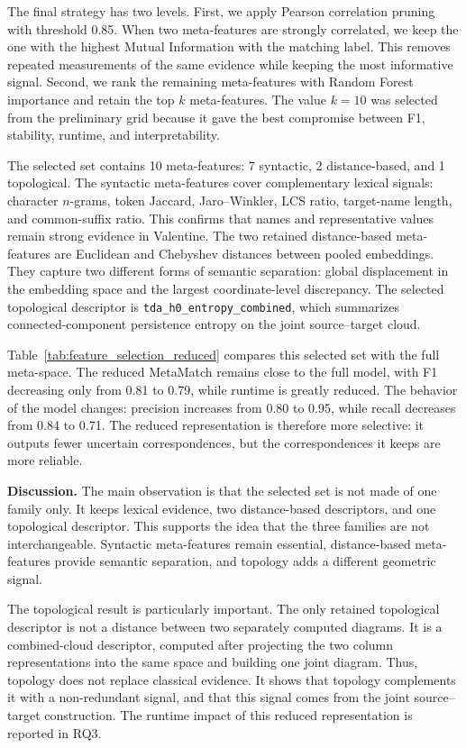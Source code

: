 \documentclass[sigconf, nonacm]{acmart}
\begin{document}
The final strategy has two levels. First, we apply Pearson correlation pruning with threshold 0.85. When two meta-features are strongly correlated, we keep the one with the highest Mutual Information with the matching label. This removes repeated measurements of the same evidence while keeping the most informative signal. Second, we rank the remaining meta-features with Random Forest importance and retain the top $k$ meta-features. The value $k=10$ was selected from the preliminary grid because it gave the best compromise between F1, stability, runtime, and interpretability.

The selected set contains 10 meta-features: 7 syntactic, 2 distance-based, and 1 topological. The syntactic meta-features cover complementary lexical signals: character $n$-grams, token Jaccard, Jaro--Winkler, LCS ratio, target-name length, and common-suffix ratio. This confirms that names and representative values remain strong evidence in Valentine. The two retained distance-based meta-features are Euclidean and Chebyshev distances between pooled embeddings. They capture two different forms of semantic separation: global displacement in the embedding space and the largest coordinate-level discrepancy. The selected topological descriptor is \texttt{tda\_h0\_entropy\_combined}, which summarizes connected-component persistence entropy on the joint source--target cloud.

Table~\ref{tab:feature_selection_reduced} compares this selected set with the full meta-space. The reduced MetaMatch remains close to the full model, with F1 decreasing only from 0.81 to 0.79, while runtime is greatly reduced. The behavior of the model changes: precision increases from 0.80 to 0.95, while recall decreases from 0.84 to 0.71. The reduced representation is therefore more selective: it outputs fewer uncertain correspondences, but the correspondences it keeps are more reliable.


\noindent\textbf{Discussion.}
The main observation is that the selected set is not made of one family only. It keeps lexical evidence, two distance-based descriptors, and one topological descriptor. This supports the idea that the three families are not interchangeable. Syntactic meta-features remain essential, distance-based meta-features provide semantic separation, and topology adds a different geometric signal.

The topological result is particularly important. The only retained topological descriptor is not a distance between two separately computed diagrams. It is a combined-cloud descriptor, computed after projecting the two column representations into the same space and building one joint diagram. Thus, topology does not replace classical evidence. It shows that topology complements it with a non-redundant signal, and that this signal comes from the joint source--target construction. The runtime impact of this reduced representation is reported in RQ3.
\end{document}
